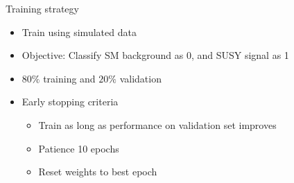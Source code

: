 \documentclass[UKenglish]{beamer}
\begin{document}
\begin{frame}{Training strategy}
    \begin{itemize}
        \item Train using simulated data 
        \item Objective: Classify SM background as 0, and SUSY signal as 1
        \item $80\%$ training and $20\%$ validation 
        \item Early stopping criteria
        \begin{itemize}
            \item Train as long as performance on validation set improves 
            \item Patience 10 epochs
            \item Reset weights to best epoch
        \end{itemize}
    \end{itemize}
\end{frame}
\end{document}
